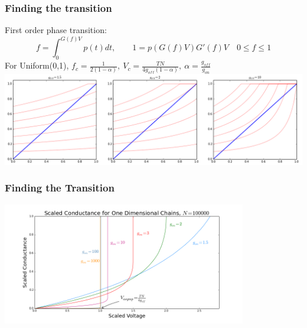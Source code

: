 \documentclass[mathserif]{beamer}
\begin{document}
\begin{frame}
\begin{columns}
\begin{center}
\end{center}

\end{columns}
\end{frame}

\begin{frame}
\frametitle{Finding the transition}
First order phase transition:
$$f = \int_0^{G(f)V} p(t) dt,  \quad\quad 1 = p(G(f)V)G'(f)V \quad 0 \le f \le 1$$
For Uniform(0,1),
$f_c = \frac{1}{2(1-\alpha)}, \: V_c = \frac{TN}{4g_{off}(1-\alpha)},
 \: \alpha = \frac{g_{off}}{g_{on}}$
\centering
\includegraphics[width=\textwidth]{SC_1D_Uniform01.png}
\end{frame}

\begin{frame}
\frametitle{Finding the Transition}
\centering
\includegraphics[width=0.8\textwidth]{1D_Cond.png}

\end{frame}
\end{document}
